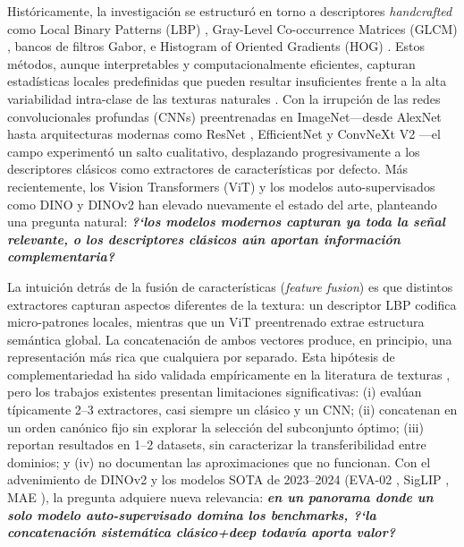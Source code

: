 \documentclass[a4paper,fleqn]{cas-sc}
\begin{document}
Hist\'oricamente, la investigaci\'on se estructur\'o en torno a descriptores \textit{handcrafted} como Local Binary Patterns (LBP) \citep{ojala2002lbp}, Gray-Level Co-occurrence Matrices (GLCM) \citep{haralick1979glcm}, bancos de filtros Gabor, e Histogram of Oriented Gradients (HOG) \citep{dalal2005hog}. Estos m\'etodos, aunque interpretables y computacionalmente eficientes, capturan estad\'isticas locales predefinidas que pueden resultar insuficientes frente a la alta variabilidad intra-clase de las texturas naturales \citep{cimpoi2014dtd}. Con la irrupci\'on de las redes convolucionales profundas (CNNs) preentrenadas en ImageNet---desde AlexNet hasta arquitecturas modernas como ResNet \citep{he2016resnet}, EfficientNet \citep{tan2019efficientnet} y ConvNeXt V2 \citep{woo2023convnextv2}---el campo experiment\'o un salto cualitativo, desplazando progresivamente a los descriptores cl\'asicos como extractores de caracter\'isticas por defecto. M\'as recientemente, los Vision Transformers (ViT) \citep{dosovitskiy2021vit,liu2021swin} y los modelos auto-supervisados como DINO \citep{caron2021dino} y DINOv2 \citep{oquab2024dinov2} han elevado nuevamente el estado del arte, planteando una pregunta natural: \textit{\textbf{?`los modelos modernos capturan ya toda la se\~nal relevante, o los descriptores cl\'asicos a\'un aportan informaci\'on complementaria?}}

La intuici\'on detr\'as de la fusi\'on de caracter\'isticas (\textit{feature fusion}) es que distintos extractores capturan aspectos diferentes de la textura: un descriptor LBP codifica micro-patrones locales, mientras que un ViT preentrenado extrae estructura sem\'antica global. La concatenaci\'on de ambos vectores produce, en principio, una representaci\'on m\'as rica que cualquiera por separado. Esta hip\'otesis de complementariedad ha sido validada emp\'iricamente en la literatura de texturas \citep{cimpoi2016fisher,sanchez2013image,zhang2017deepten}, pero los trabajos existentes presentan limitaciones significativas: (i) eval\'uan t\'ipicamente 2--3 extractores, casi siempre un cl\'asico y un CNN; (ii) concatenan en un orden can\'onico fijo sin explorar la selecci\'on del subconjunto \'optimo; (iii) reportan resultados en 1--2 datasets, sin caracterizar la transferibilidad entre dominios; y (iv) no documentan las aproximaciones que no funcionan. Con el advenimiento de DINOv2 \citep{oquab2024dinov2} y los modelos SOTA de 2023--2024 (EVA-02 \citep{fang2023eva02}, SigLIP \citep{zhai2023siglip}, MAE \citep{he2022mae}), la pregunta adquiere nueva relevancia: \textit{\textbf{en un panorama donde un solo modelo auto-supervisado domina los benchmarks, ?`la concatenaci\'on sistem\'atica cl\'asico+deep todav\'ia aporta valor?}}
\end{document}
